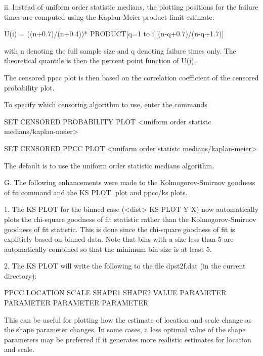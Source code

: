 {          ii. Instead of uniform order statistic medians, the
              plotting positions for the failure times are
              computed using the Kaplan-Meier product limit
              estimate:

                 U(i) = ((n+0.7)/(n+0.4))*
                        PRODUCT[q=1 to i][(n-q+0.7)/(n-q+1.7)]

              with n denoting the full sample size and q denoting
              failure times only.  The theoretical quantile is then
              the percent point function of U(i).

          The censored ppcc plot is then based on the correlation
          coefficient of the censored probability plot.

          To specify which censoring algorithm to use, enter the
          commands

             SET CENSORED PROBABILITY PLOT
                 <uniform order statistc medians/kaplan-meier>

             SET CENSORED PPCC PLOT
                 <uniform order statistc medians/kaplan-meier>

          The default is to use the uniform order statistic medians
          algorithm.

    G. The following enhancements were made to the
       Kolmogorov-Smirnov goodness of fit command and the KS PLOT.
       plot and ppcc/ks plots.
 
       1. The KS PLOT for the binned case (<dist> KS PLOT Y X) now
          automatically plots the chi-square goodness of fit
          statistic rather than the Kolmogorov-Smirnov goodness of
          fit statistic.  This is done since the chi-square goodness
          of fit is expliticly based on binned data.  Note that
          bins with a size less than 5 are automatically combined
          so that the minimum bin size is at least 5.

       2. The KS PLOT will write the following to the file
          dpst2f.dat (in the current directory):

            PPCC   LOCATION    SCALE       SHAPE1      SHAPE2
            VALUE  PARAMETER   PARAMETER   PARAMETER   PARAMETER

          This can be useful for plotting how the estimate of location
          and scale change as the shape parameter changes.  In some
          cases, a less optimal value of the shape parameters may
          be preferred if it generates more realistic estimates for
          location and scale.

}
